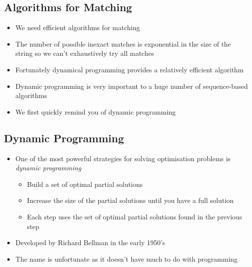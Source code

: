 \Outline %

\begin{slide}
\section{Algorithms for Matching}

\begin{PauseHighLight}
  \begin{itemize}
  \item We need efficient algorithms for matching\pause
  \item The number of possible inexact matches is exponential in the size of the
    string so we can't exhaustively try all matches\pause
  \item Fortunately dynamical programming provides a relatively
    efficient algorithm\pause
  \item Dynamic programming is very important to a huge number of
    sequence-based algorithms\pause
  \item We first quickly remind you of dynamic programming\pause
  \end{itemize}
\end{PauseHighLight}

\end{slide}


\begin{slide}
\section{Dynamic Programming}

\begin{PauseHighLight}
  \begin{itemize}
  \item One of the most powerful strategies for solving optimisation
    problems is \emph{dynamic programming}\pause
    \begin{itemize}\squeeze
    \item Build a set of optimal partial solutions\pause
    \item Increase the size of the partial solutions until you have a
      full solution\pause
    \item Each step uses the set of optimal partial solutions found in
      the previous step\pause
    \end{itemize}
  \item Developed by Richard Bellman in the early 1950's\pause
  \item The name is unfortunate as it doesn't have much to do with
    programming\pause 
  \end{itemize}
\end{PauseHighLight}

\end{slide}

